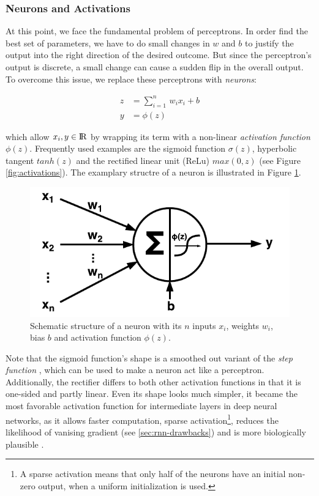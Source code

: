 \subsubsection{Neurons and Activations}

At this point, we face the fundamental problem of perceptrons. In order find the best set of parameters, we have to do small changes in $ w $ and $ b $ to justify the output into the right direction of the desired outcome. But since the perceptron's output is discrete, a small change can cause a sudden flip in the overall output. To overcome this issue, we replace these perceptrons with \textit{neurons}:

\begin{equation}
\begin{aligned}
z &= \sum\limits_{i=1}^n \, w_{i}x_{i} + b \\
y &= \phi(z)
\end{aligned}
\end{equation}

which allow $ x_{i}, y \in \rm I\!R $ by wrapping its term with a non-linear \textit{activation function} $ \phi(z) $. Frequently used examples are the sigmoid function $ \sigma(z) $, hyperbolic tangent $ tanh(z) $ and the rectified linear unit (ReLu) $ max(0, z) $ (see Figure \ref{fig:activations}). The examplary structre of a neuron is illustrated in Figure \ref{fig:neuron}.

\begin{figure}[htpb]
	\centering
	\includegraphics[scale=0.6]{figures/neuron.pdf}
	\caption[Schematic neuron]{Schematic structure of a neuron with its $ n $ inputs $x_{i}$, weights $w_{i}$, bias $ b $ and activation function $\phi(z)$.} \label{fig:neuron}
\end{figure}

Note that the sigmoid function's shape is a smoothed out variant of the \textit{step function} \parencite{neural_nets_deep_learning}, which can be used to make a neuron act like a perceptron. Additionally, the rectifier differs to both other activation functions in that it is one-sided and partly linear. Even its shape looks much simpler, it became the most favorable activation function for intermediate layers in deep neural networks, as it allows faster computation, sparse activation\footnote{{A sparse activation means that only half of the neurons have an initial non-zero output, when a uniform initialization is used.}}, reduces the likelihood of vanising gradient (see \ref{sec:rnn-drawbacks}) and is more biologically plausible \parencite{relu}.

